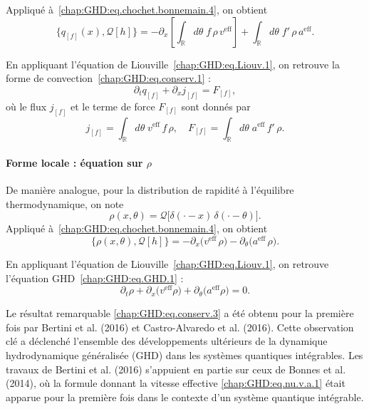 Appliqué à~\eqref{chap:GHD:eq.chochet.bonnemain.4}, on obtient
\begin{equation}\label{chap:GHD:eq.chochet.bonnemain.5}
	\{q_{[f]}(x), \mathcal{Q}[h]\} 
	= - \partial_x \left[ \int_{\mathbb{R}} d\theta \; f \, \rho \, v^{\mathrm{eff}} \right]
	+ \int_{\mathbb{R}} d\theta \; f' \, \rho \, a^{\mathrm{eff}}.
\end{equation}

En appliquant l’équation de Liouville~\eqref{chap:GHD:eq.Liouv.1}, on retrouve la forme de convection~\eqref{chap:GHD:eq.conserv.1} :
\begin{equation}\label{chap:GHD:eq.conserv.2}
	\partial_t q_{[f]} + \partial_x j_{[f]} = F_{[f]},
\end{equation}
où le flux $j_{[f]}$ et le terme de force $F_{[f]}$ sont donnés par
\begin{equation}\label{chap:GHD:eq.conserv.2.1}
	j_{[f]} = \int_{\mathbb{R}} d\theta \; v^{\mathrm{eff}} \, f \, \rho,
	\quad F_{[f]} = \int_{\mathbb{R}} d\theta \; a^{\mathrm{eff}} \, f' \, \rho.
\end{equation}

\paragraph{Forme locale : équation sur \texorpdfstring{$\rho$}{rho}} 
De manière analogue, pour la distribution de rapidité à l’équilibre thermodynamique, on note
\begin{equation}
	\rho(x,\theta) = \mathcal{Q}\big[ \delta(\cdot - x) \, \delta(\cdot - \theta) \big].
\end{equation}
Appliqué à~\eqref{chap:GHD:eq.chochet.bonnemain.4}, on obtient
\begin{equation}\label{chap:GHD:eq.chochet.bonnemain.6}
	\{\rho(x,\theta), \mathcal{Q}[h]\} 
	= - \partial_x \big( v^{\mathrm{eff}} \, \rho \big)
	  - \partial_\theta \big( a^{\mathrm{eff}} \, \rho \big).
\end{equation}

En appliquant l’équation de Liouville~\eqref{chap:GHD:eq.Liouv.1}, on retrouve l’équation GHD~\eqref{chap:GHD:eq.GHD.1} :
\begin{equation}\label{chap:GHD:eq.conserv.3}
	\partial_t \rho + \partial_x \big( v^{\mathrm{eff}} \rho \big)
	+ \partial_\theta \big( a^{\mathrm{eff}} \rho \big) = 0.
\end{equation}

Le résultat remarquable \eqref{chap:GHD:eq.conserv.3} a été obtenu pour la première fois par Bertini et al. (2016) et Castro-Alvaredo et al. (2016). Cette observation clé a déclenché l’ensemble des développements ultérieurs de la dynamique hydrodynamique généralisée (GHD) dans les systèmes quantiques intégrables. Les travaux de Bertini et al. (2016) s’appuient en partie sur ceux de Bonnes et al. (2014), où la formule donnant la vitesse effective \eqref{chap:GHD:eq.nu.v.a.1} était apparue pour la première fois dans le contexte d’un système quantique intégrable.\\

